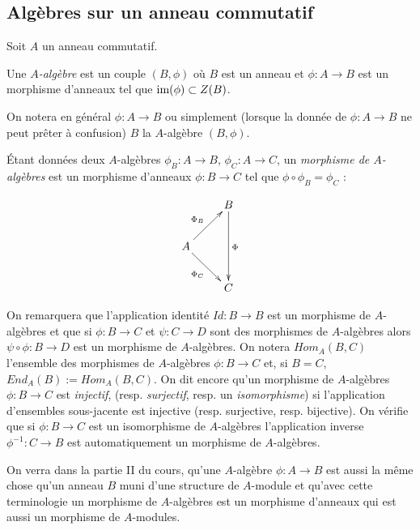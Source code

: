 \subsection{Algèbres sur un anneau commutatif}

Soit $A$ un anneau commutatif.

\begin{definition}
    Une \emph{$A$-algèbre} est un
    couple $(B,\phi)$ où $B$ est  un anneau et $\phi:A\rightarrow B$ est un
    morphisme d'anneaux tel que $\hbox{\rm im}(\phi)\subset Z(B)$.
\end{definition}

On notera en général $\phi:A\rightarrow B$ ou simplement  (lorsque la donnée de
$\phi:A\rightarrow B$ ne peut prêter à confusion) $B$  la $A$-algèbre
$(B,\phi)$.

\begin{definition}
    Étant données deux $A$-algèbres $\phi_B:A\rightarrow B$,
    $\phi_C:A\rightarrow C$, un \emph{morphisme de $A$-algèbres} est un
    morphisme d'anneaux $\phi:B\rightarrow C$ tel que $\phi\circ \phi_B=\phi_C$
    :

    \[\xymatrix{ & B \ar[dd]^\Phi \\ A \ar[ru]^{\Phi_B} \ar[rd]_{\Phi_C} \\ & C
    }\]
\end{definition}

On remarquera que l'application identité $Id:B\rightarrow B$ est un morphisme
de $A$-algèbres et que si $\phi:B\rightarrow C$ et $\psi:C\rightarrow D$ sont
des morphismes de $A$-algèbres alors $\psi\circ \phi:B\rightarrow D$ est un
morphisme de $A$-algèbres. On notera $Hom_A(B,C)$ l'ensemble des morphismes de
$A$-algèbres $\phi:B\rightarrow C$ et, si $B=C$, $End_A(B):=Hom_A(B,C)$. On dit
encore qu'un morphisme de $A$-algèbres $\phi:B\rightarrow C$ est
\emph{injectif}, (resp. \emph{surjectif}, resp. un \emph{isomorphisme}) si
l'application d'ensembles sous-jacente est  injective (resp. surjective, resp.
bijective). On vérifie que si $\phi:B\rightarrow C$ est un isomorphisme de
$A$-algèbres l'application inverse $\phi^{-1}:C\rightarrow B$ est
automatiquement un morphisme de $A$-algèbres.

\begin{remarque}
    On verra dans la partie II du cours, qu'une $A$-algèbre $\phi:A\rightarrow
    B$ est aussi la même chose qu'un anneau $B$ muni d'une structure de
    $A$-module  et qu'avec cette terminologie un morphisme de $A$-algèbres est
    un morphisme d'anneaux qui est aussi un morphisme de $A$-modules.
\end{remarque}

